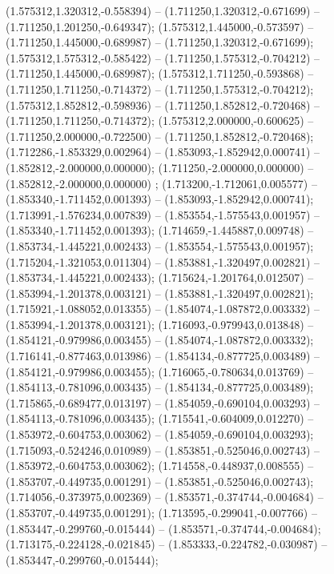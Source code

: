  (1.575312,1.320312,-0.558394) -- (1.711250,1.320312,-0.671699) -- (1.711250,1.201250,-0.649347);
 (1.575312,1.445000,-0.573597) -- (1.711250,1.445000,-0.689987) -- (1.711250,1.320312,-0.671699);
 (1.575312,1.575312,-0.585422) -- (1.711250,1.575312,-0.704212) -- (1.711250,1.445000,-0.689987);
 (1.575312,1.711250,-0.593868) -- (1.711250,1.711250,-0.714372) -- (1.711250,1.575312,-0.704212);
 (1.575312,1.852812,-0.598936) -- (1.711250,1.852812,-0.720468) -- (1.711250,1.711250,-0.714372);
 (1.575312,2.000000,-0.600625) -- (1.711250,2.000000,-0.722500) -- (1.711250,1.852812,-0.720468);
 (1.712286,-1.853329,0.002964) -- (1.853093,-1.852942,0.000741) -- (1.852812,-2.000000,0.000000);
 (1.711250,-2.000000,0.000000) -- (1.852812,-2.000000,0.000000) ;
 (1.713200,-1.712061,0.005577) -- (1.853340,-1.711452,0.001393) -- (1.853093,-1.852942,0.000741);
 (1.713991,-1.576234,0.007839) -- (1.853554,-1.575543,0.001957) -- (1.853340,-1.711452,0.001393);
 (1.714659,-1.445887,0.009748) -- (1.853734,-1.445221,0.002433) -- (1.853554,-1.575543,0.001957);
 (1.715204,-1.321053,0.011304) -- (1.853881,-1.320497,0.002821) -- (1.853734,-1.445221,0.002433);
 (1.715624,-1.201764,0.012507) -- (1.853994,-1.201378,0.003121) -- (1.853881,-1.320497,0.002821);
 (1.715921,-1.088052,0.013355) -- (1.854074,-1.087872,0.003332) -- (1.853994,-1.201378,0.003121);
 (1.716093,-0.979943,0.013848) -- (1.854121,-0.979986,0.003455) -- (1.854074,-1.087872,0.003332);
 (1.716141,-0.877463,0.013986) -- (1.854134,-0.877725,0.003489) -- (1.854121,-0.979986,0.003455);
 (1.716065,-0.780634,0.013769) -- (1.854113,-0.781096,0.003435) -- (1.854134,-0.877725,0.003489);
 (1.715865,-0.689477,0.013197) -- (1.854059,-0.690104,0.003293) -- (1.854113,-0.781096,0.003435);
 (1.715541,-0.604009,0.012270) -- (1.853972,-0.604753,0.003062) -- (1.854059,-0.690104,0.003293);
 (1.715093,-0.524246,0.010989) -- (1.853851,-0.525046,0.002743) -- (1.853972,-0.604753,0.003062);
 (1.714558,-0.448937,0.008555) -- (1.853707,-0.449735,0.001291) -- (1.853851,-0.525046,0.002743);
 (1.714056,-0.373975,0.002369) -- (1.853571,-0.374744,-0.004684) -- (1.853707,-0.449735,0.001291);
 (1.713595,-0.299041,-0.007766) -- (1.853447,-0.299760,-0.015444) -- (1.853571,-0.374744,-0.004684);
 (1.713175,-0.224128,-0.021845) -- (1.853333,-0.224782,-0.030987) -- (1.853447,-0.299760,-0.015444);
